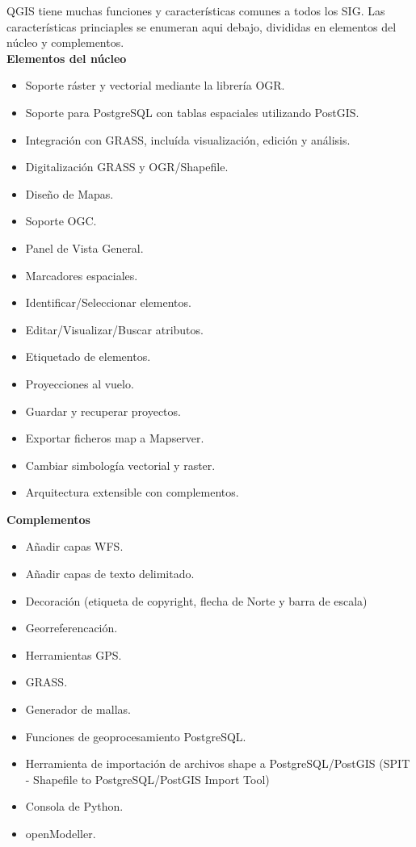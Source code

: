 QGIS tiene muchas funciones y características comunes a todos los SIG. 
Las características princiaples se enumeran aqui debajo, divididas en
elementos del núcleo y complementos. \\

\textbf{Elementos del núcleo}

\begin{itemize}
\item Soporte ráster y vectorial mediante la librería OGR.
\item Soporte para PostgreSQL con tablas espaciales utilizando PostGIS.
\item Integración con GRASS, incluída visualización, edición y análisis.
\item Digitalización GRASS y OGR/Shapefile.
\item Diseño de Mapas.
\item Soporte OGC.
\item Panel de Vista General.
\item Marcadores espaciales.
\item Identificar/Seleccionar elementos.
\item Editar/Visualizar/Buscar atributos.
\item Etiquetado de elementos.
\item Proyecciones al vuelo.
\item Guardar y recuperar proyectos.
\item Exportar ficheros map a Mapserver.
\item Cambiar simbología vectorial y raster.
\item Arquitectura extensible con complementos.
\end{itemize}

\textbf{Complementos}

\begin{itemize}
\item Añadir capas WFS.
\item Añadir capas de texto delimitado.
\item Decoración (etiqueta de copyright, flecha de Norte y barra de escala)
\item Georreferencación.
\item Herramientas GPS.
\item GRASS.
\item Generador de mallas.
\item Funciones de geoprocesamiento PostgreSQL.
\item Herramienta de importación de archivos shape a PostgreSQL/PostGIS (SPIT - Shapefile to PostgreSQL/PostGIS Import Tool)
\item Consola de Python.
\item openModeller.
\end{itemize}

